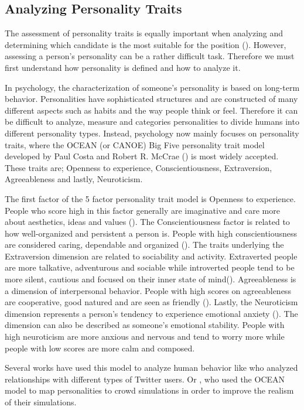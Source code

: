 \subsection{Analyzing Personality Traits}
The assessment of personality traits is equally important when analyzing and determining which candidate is the most suitable for the position (\cite{kinsman2005hiring}). However, assessing a person's personality can be a rather difficult task. Therefore we must first understand how personality is defined and how to analyze it. 

In psychology, the characterization of someone's personality is based on long-term behavior. Personalities have sophisticated structures and are constructed of many different aspects such as habits and the way people think or feel. Therefore it can be difficult to analyze, measure and categories personalities to divide humans into different personality types. Instead, psychology now mainly focuses on personality traits, where the OCEAN (or CANOE) Big Five personality trait model developed by Paul Costa and Robert R. McCrae (\cite{costa1992neo}) is most widely accepted. These traits are; Openness to experience, Conscientiousness, Extraversion, Agreeableness and lastly, Neuroticism. 

The first factor of the 5 factor personality trait model is Openness to experience. People who score high in this factor generally are imaginative and care more about aesthetics, ideas and values (\cite{mccrae1993openness}). The Conscientiousness factor is related to how well-organized and persistent a person is. People with high conscientiousness are considered caring, dependable and organized (\cite{widiger2017oxford}). The traits underlying the Extraversion dimension are related to sociability and activity. Extraverted people are more talkative, adventurous and sociable while introverted people tend to be more silent, cautious and focused on their inner state of mind(\cite{widiger2017oxford}). Agreeableness is a dimension of interpersonal behavior. People with high scores on agreeableness are cooperative, good natured and are seen as friendly (\cite{graziano1997agreeableness}). Lastly, the Neuroticism dimension represents a person's tendency to experience emotional anxiety (\cite{widiger2017oxford}). The dimension can also be described as someone's emotional stability. People with high neuroticism are more anxious and nervous and tend to worry more while people with low scores are more calm and composed. 

Several works have used this model to analyze human behavior like \textcite{quercia2011our} who analyzed relationships with different types of Twitter users. Or \textcite{allbeck2008creating}, who used the OCEAN model to map personalities to crowd simulations in order to improve the realism of their simulations. 

